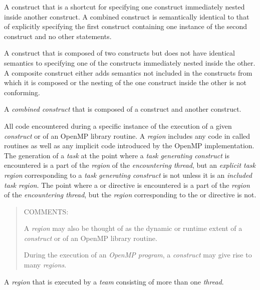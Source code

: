 \glossarydefstart
A construct that is a shortcut for specifying one construct immediately nested inside another construct. A combined construct is semantically identical to that of explicitly specifying the first construct containing one instance of the second construct and no other statements.
\glossarydefend

\glossarydefstart
A construct that is composed of two constructs but does not have identical semantics to specifying one of the constructs immediately nested inside the other. A composite construct either adds semantics not included in the constructs from which it is composed or the nesting of the one construct inside the other is not conforming.
\glossarydefend

\glossarydefstart
A \emph{combined construct} that is composed of a  construct and another construct.
\glossarydefend


\glossarydefstart
All code encountered during a specific instance of the execution of a given
\emph{construct} or of an OpenMP library routine. A \emph{region} includes any code in called
routines as well as any implicit code introduced by the OpenMP implementation.
The generation of a \emph{task} at the point where a \emph{task generating construct} is encountered is a
part of the \emph{region} of the \emph{encountering thread}, but an \emph{explicit task region}
corresponding to a \emph{task generating construct} is not unless it is an
\emph{included task region}. The point where a  or 
directive is encountered is a part of the \emph{region} of the \emph{encountering thread}, but the
\emph{region} corresponding to the  or  directive is not.

\begin{quote}
COMMENTS:

A \emph{region} may also be thought of as the dynamic or runtime extent of a
\emph{construct} or of an OpenMP library routine.

During the execution of an \emph{OpenMP program}, a \emph{construct} may give
rise to many \emph{regions}.
\end{quote}
\glossarydefend

\glossarydefstart
A  \emph{region} that is executed by a \emph{team} consisting of more than one
\emph{thread}.
\glossarydefend

